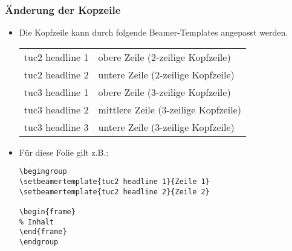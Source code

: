 \begin{frame}[containsverbatim]
\frametitle{Änderung der Kopzeile}

\begin{itemize}
\item Die Kopfzeile kann durch folgende Beamer-Templates angepasst werden.
  \begin{center}
  \begin{tabularx}{\linewidth}{>{\ttfamily}lX}
  tuc2 headline 1 & obere Zeile (2-zeilige Kopfzeile)    \\
  tuc2 headline 2 & untere Zeile (2-zeilige Kopfzeile)   \\
  tuc3 headline 1 & obere Zeile (3-zeilige Kopfzeile)    \\
  tuc3 headline 2 & mittlere Zeile (3-zeilige Kopfzeile) \\
  tuc3 headline 3 & untere Zeile (3-zeilige Kopfzeile)   \\
  \end{tabularx}
  \end{center}

\item Für diese Folie gilt z.B.:
\begingroup
\small
\begin{lstlisting}[style=numberedblock,language={[LaTeX]TeX}]
\begingroup
\setbeamertemplate{tuc2 headline 1}{Zeile 1}
\setbeamertemplate{tuc2 headline 2}{Zeile 2}

\begin{frame}
% Inhalt
\end{frame}
\endgroup
\end{lstlisting}
\endgroup
\end{itemize}
\end{frame}
\endgroup


